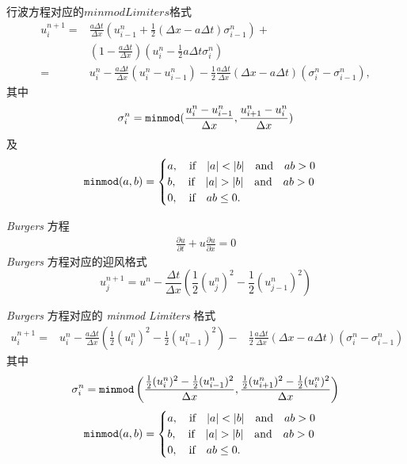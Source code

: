 \documentclass[10.5pt
]{article}
\begin{document}
 
行波方程对应的$minmod Limiters$格式
\begin{equation}
\begin{aligned}
u_i^{n+1}= & \frac{a \Delta t}{\Delta x}\left(u_{i-1}^n+\frac{1}{2}(\Delta x-a \Delta t) \sigma_{i-1}^n\right)+ \\
& \left(1-\frac{a \Delta t}{\Delta x}\right)\left(u_i^n-\frac{1}{2} a \Delta t \sigma_i^n\right) \\
= & u_i^n-\frac{a \Delta t}{\Delta x}\left(u_i^n-u_{i-1}^n\right)-\frac{1}{2} \frac{a \Delta t}{\Delta x}(\Delta x-a \Delta t)\left(\sigma_i^n-\sigma_{i-1}^n\right),
\end{aligned}
\end{equation}
其中
\begin{equation}
	\sigma_i^n = \verb|minmod| ( \frac{u_i^n - u_{i-1}^{n}}{ \Delta x }, \frac{u_{i+1}^n - u_{i}^{n}}{ \Delta x } )
\end{equation}
及
\begin{equation}
	\verb|minmod|(a, b) = 
	\begin{cases}
		a, \qif |a| < |b| \qand ab > 0\\
		b, \qif |a| > |b| \qand ab > 0\\
		0, \qif ab \leq 0.
	\end{cases}
\end{equation}

\textit{Burgers} 方程
\begin{align}
\frac{\partial u}{\partial t} + u \frac{\partial u}{\partial x} = 0
\end{align}
\textit{Burgers} 方程对应的迎风格式
\begin{equation}
u_j^{n+1} = u^n - \frac{\Delta t}{\Delta x} \left( \frac{1}{2} (u_j^n)^2 - \frac{1}{2} (u_{j-1}^n)^2\right)
\end{equation}

\textit{Burgers} 方程对应的 \textit{minmod Limiters} 格式
\begin{equation}
\begin{aligned}
u_i^{n+1}=&
  u_i^n-\frac{a \Delta t}{\Delta x}\left( \frac{1}{2} (u_i^n)^2- \frac{1}{2} (u_{i-1}^n)^2 \right)-
 &\frac{1}{2} \frac{a \Delta t}{\Delta x}(\Delta x-a \Delta t)\left(\sigma_i^n-\sigma_{i-1}^n\right)
\end{aligned}
\end{equation}
其中
\begin{equation}
	\sigma_i^n = \verb|minmod| \left( \frac{ \frac{1}{2} (u_i^n)^2 - \frac{1}{2} (u_{i-1}^{n})^2 }{ \Delta x }, \frac{ \frac{1}{2} (u_{i+1}^n)^2 - \frac{1}{2} (u_{i}^{n})^2}{ \Delta x } \right)
\end{equation}
\begin{equation}
	\verb|minmod|(a, b) = 
	\begin{cases}
		a, \qif |a| < |b| \qand ab > 0\\
		b, \qif |a| > |b| \qand ab > 0\\
		0, \qif ab \leq 0.
	\end{cases}
\end{equation}
\end{document}
